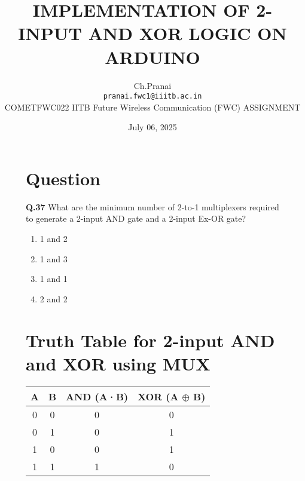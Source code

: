 \documentclass[12pt,a4paper]{article}
\title{\textbf{IMPLEMENTATION OF 2-INPUT AND XOR LOGIC ON ARDUINO}}
\author{Ch.Pranai \\ \texttt{pranai.fwc1@iiitb.ac.in} \\
 \hspace{-0.3cm}COMETFWC022\hspace{0.5cm} IITB Future Wireless Communication (FWC)\hspace{0.4cm} ASSIGNMENT}
\date{July 06, 2025}
\begin{document}
\maketitle


\begin{figure}[H]
  \centering
  \begin{minipage}[t]{0.48\textwidth}
    \section*{Question}
    \small
    \noindent\textbf{Q.37} \quad What are the minimum number of 2-to-1 multiplexers required to generate a 2-input AND gate and a 2-input Ex-OR gate?
    \begin{enumerate}[label=(\Alph*)]
        \item 1 and 2
        \item 1 and 3
        \item 1 and 1
        \item 2 and 2
    \end{enumerate}

    \vspace{0.3cm}
    \section*{Truth Table for 2-input AND and XOR using MUX}
    \renewcommand{\arraystretch}{1.4}
    \begin{tabular}{|c|c|c|c|}
    \hline
    \textbf{A} & \textbf{B} & \textbf{AND (A·B)} & \textbf{XOR (A $\oplus$ B)} \\
    \hline
    0 & 0 & 0 & 0 \\
    0 & 1 & 0 & 1 \\
    1 & 0 & 0 & 1 \\
    1 & 1 & 1 & 0 \\
    \hline
    \end{tabular}
  \end{minipage}\hfill
  \begin{minipage}[t]{0.48\textwidth}

\end{minipage}
\end{figure}
\end{document}
